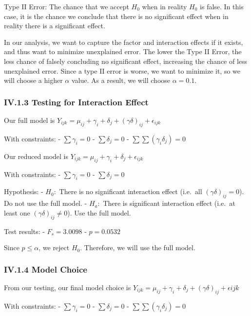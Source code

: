 \documentclass[
]{article}
\begin{document}
Type II Error: The chance that we accept \(H_0\) when in reality \(H_0\)
is false. In this case, it is the chance we conclude that there is no
significant effect when in reality there is a significant effect.

In our analysis, we want to capture the factor and interaction effects
if it exists, and thus want to minimize unexplained error. The lower the
Type II Error, the less chance of falsely concluding no significant
effect, increasing the chance of less unexplained error. Since a type II
error is worse, we want to minimize it, so we will choose a higher
\(\alpha\) value. As a result, we will choose \(\alpha = 0.1\).

\subsubsection{IV.1.3 Testing for Interaction
Effect}\label{iv.1.3-testing-for-interaction-effect}

Our full model is
\(Y_{ijk} = \mu_{ij} + \gamma_i + \delta_j + (\gamma\delta)_{ij} + \epsilon_{ijk}\)

With constraints: - \(\sum \gamma_i = 0\) - \(\sum \delta_j = 0\) -
\(\sum \sum (\gamma_i \delta_j) = 0\)

Our reduced model is
\(Y_{ijk} = \mu_{ij} + \gamma_i + \delta_j + \epsilon_{ijk}\)

With constraints: - \(\sum \gamma_i = 0\) - \(\sum \delta_j = 0\)

Hypothesis: - \(H_0:\) There is no significant interaction effect
(i.e.~all \((\gamma\delta)_{ij} = 0\)). Do not use the full model. -
\(H_a:\) There is significant interaction effect (i.e.~at least one
\((\gamma\delta)_{ij} \neq 0\)). Use the full model.

Test results: - \(F_s = 3.0098\) - \(p = 0.0532\)

Since \(p \leq \alpha\), we reject \(H_0\). Therefore, we will use the
full model.

\subsubsection{IV.1.4 Model Choice}\label{iv.1.4-model-choice}

From our testing, our final model choice is
\(Y_{ijk} = \mu_{ij} + \gamma_i + \delta_j + (\gamma \delta)_{ij} + \epsilon{ijk}\)

With constraints: - \(\sum \gamma_i = 0\) - \(\sum \delta_j = 0\) -
\(\sum \sum (\gamma_i \delta_j) = 0\)
\end{document}
